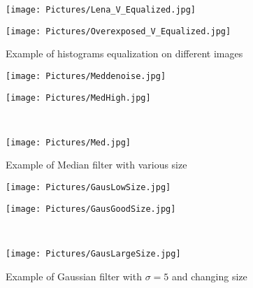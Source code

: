 \documentclass[11pt,a4paper]{article}
\begin{document}
\begin{figure}[htbp]
\begin{minipage}{0.7\textwidth}
  \begin{minipage}{0.4\textwidth}
    \centering
  \texttt{[image: Pictures/Lena\_V\_Equalized.jpg]}
  \end{minipage}%
  \begin{minipage}{0.6\textwidth}
    \centering
  \texttt{[image: Pictures/Overexposed\_V\_Equalized.jpg]}
  \end{minipage}
  \label{fig:v}
  \end{minipage}

\caption{Example of histograms equalization on different images} 
\end{figure}


\begin{figure}[htbp]
\centering
\begin{minipage}{0.5\textwidth}
  \centering
\texttt{[image: Pictures/Meddenoise.jpg]}
\label{fig:mednoise}
\end{minipage}%
\begin{minipage}{0.5\textwidth}
  \centering
\texttt{[image: Pictures/MedHigh.jpg]}
\end{minipage}\\
\begin{center}
\begin{minipage}{0.5\textwidth}
  \centering
\texttt{[image: Pictures/Med.jpg]}
  \end{minipage}
\end{center}
\caption{Example of Median filter with various size}
\end{figure}

\begin{figure}[htbp]
  \centering
  \begin{minipage}{0.5\textwidth}
    \centering
  \texttt{[image: Pictures/GausLowSize.jpg]}
  \end{minipage}%
  \begin{minipage}{0.5\textwidth}
    \centering
  \texttt{[image: Pictures/GausGoodSize.jpg]}
  \end{minipage}\\
  \begin{center}
  \begin{minipage}{0.5\textwidth}
    \centering
  \texttt{[image: Pictures/GausLargeSize.jpg]}
    \end{minipage}
  \end{center}
  \caption{Example of Gaussian filter with $\sigma=5$ and changing size}
  \end{figure}
\end{document}
